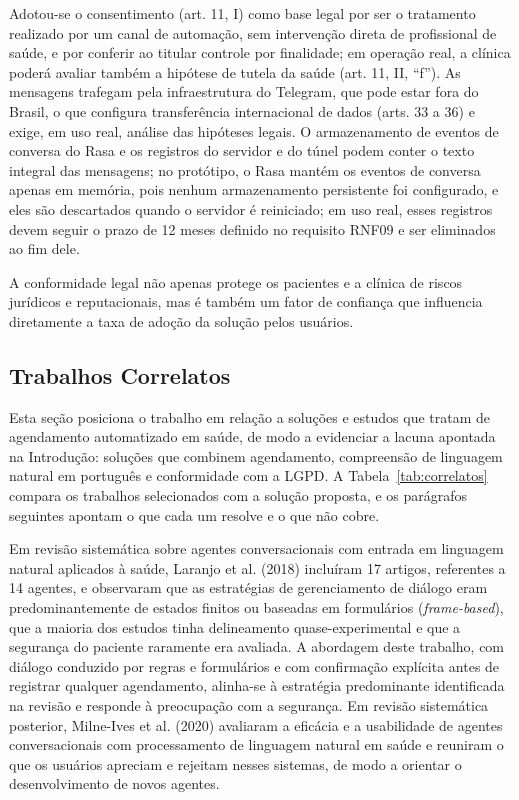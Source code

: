 \documentclass[12pt,a4paper]{extarticle}
\begin{document}
Adotou-se o consentimento (art. 11, I) como base legal por ser o tratamento realizado por um canal de automação, sem intervenção direta de profissional de saúde, e por conferir ao titular controle por finalidade; em operação real, a clínica poderá avaliar também a hipótese de tutela da saúde (art. 11, II, ``f''). As mensagens trafegam pela infraestrutura do Telegram, que pode estar fora do Brasil, o que configura transferência internacional de dados (arts. 33 a 36) e exige, em uso real, análise das hipóteses legais. O armazenamento de eventos de conversa do Rasa e os registros do servidor e do túnel podem conter o texto integral das mensagens; no protótipo, o Rasa mantém os eventos de conversa apenas em memória, pois nenhum armazenamento persistente foi configurado, e eles são descartados quando o servidor é reiniciado; em uso real, esses registros devem seguir o prazo de 12 meses definido no requisito RNF09 e ser eliminados ao fim dele.

 A conformidade legal não apenas protege os pacientes e a clínica de riscos jurídicos e reputacionais, mas é também um fator de confiança que influencia diretamente a taxa de adoção da solução pelos usuários.

 \subsection{Trabalhos Correlatos}
\label{sec:correlatos}

Esta seção posiciona o trabalho em relação a soluções e estudos que tratam de agendamento automatizado em saúde, de modo a evidenciar a lacuna apontada na Introdução: soluções que combinem agendamento, compreensão de linguagem natural em português e conformidade com a LGPD. A Tabela~\ref{tab:correlatos} compara os trabalhos selecionados com a solução proposta, e os parágrafos seguintes apontam o que cada um resolve e o que não cobre.

Em revisão sistemática sobre agentes conversacionais com entrada em linguagem natural aplicados à saúde, Laranjo et al. (2018) incluíram 17 artigos, referentes a 14 agentes, e observaram que as estratégias de gerenciamento de diálogo eram predominantemente de estados finitos ou baseadas em formulários (\textit{frame-based}), que a maioria dos estudos tinha delineamento quase-experimental e que a segurança do paciente raramente era avaliada. A abordagem deste trabalho, com diálogo conduzido por regras e formulários e com confirmação explícita antes de registrar qualquer agendamento, alinha-se à estratégia predominante identificada na revisão e responde à preocupação com a segurança. Em revisão sistemática posterior, Milne-Ives et al. (2020) avaliaram a eficácia e a usabilidade de agentes conversacionais com processamento de linguagem natural em saúde e reuniram o que os usuários apreciam e rejeitam nesses sistemas, de modo a orientar o desenvolvimento de novos agentes.
\end{document}
